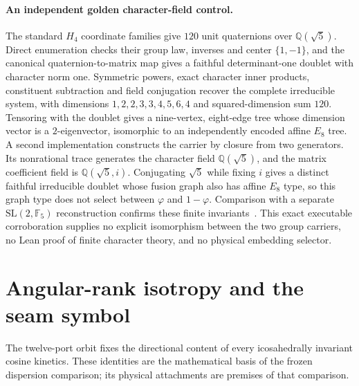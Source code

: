 \documentclass[11pt]{article}
\theoremstyle{remark}
\theoremstyle{plain}
\begin{document}
\paragraph{An independent golden character-field control.}
The standard \(H_4\) coordinate families give \(120\) unit quaternions over
\(\mathbb Q(\sqrt5)\). Direct enumeration checks their group law, inverses
and center \(\{1,-1\}\), and the canonical quaternion-to-matrix map gives a
faithful determinant-one doublet with character norm one. Symmetric powers,
exact character inner products, constituent subtraction and field
conjugation recover the complete irreducible system, with dimensions
\(1,2,2,3,3,4,5,6,4\) and squared-dimension sum \(120\). Tensoring with the
doublet gives a nine-vertex, eight-edge tree whose dimension vector is a
\(2\)-eigenvector, isomorphic to an independently encoded affine \(E_8\)
tree. A second implementation constructs the carrier by closure from two
generators. Its nonrational trace generates the character field
\(\mathbb Q(\sqrt5)\), and the matrix coefficient field is
\(\mathbb Q(\sqrt5,i)\). Conjugating \(\sqrt5\) while fixing \(i\) gives a
distinct faithful irreducible doublet whose fusion graph also has affine
\(E_8\) type, so this graph type does not select between \(\varphi\) and
\(1-\varphi\). Comparison with a separate \(\mathrm{SL}(2,\mathbb F_5)\)
reconstruction confirms these finite invariants~\cite{ophrepo}. This exact
executable corroboration supplies no explicit isomorphism between the two
group carriers, no Lean proof of finite character theory, and no physical
embedding selector.

\section{Angular-rank isotropy and the seam symbol}
\label{sec:angular-rank-isotropy}

The twelve-port orbit fixes the directional content of every
icosahedrally invariant cosine kinetics. These identities are the
mathematical basis of the frozen dispersion comparison; its physical
attachments are premises of that comparison.
\end{document}
